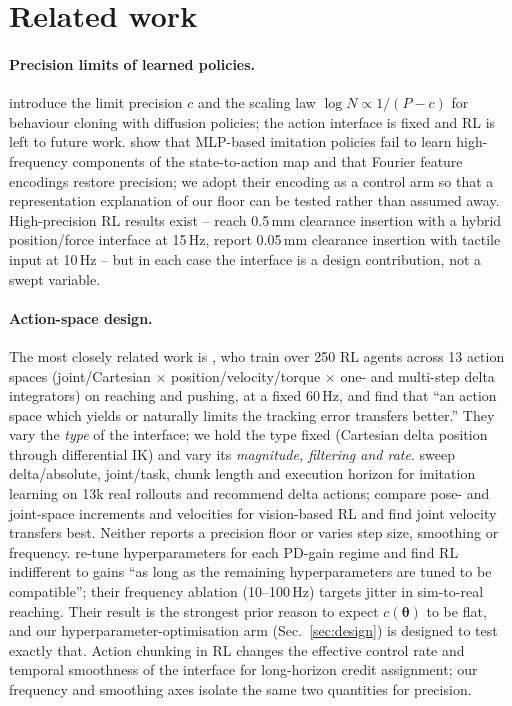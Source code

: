 \documentclass{article}
\newcommand{\iface}{\boldsymbol{\theta}}
\begin{document}
\section{Related work}
\label{sec:related}

\paragraph{Precision limits of learned policies.}
\citet{xu2026curse} introduce the limit precision $c$ and the scaling law $\log N \propto 1/(P-c)$ for behaviour cloning with diffusion policies; the action interface is fixed and RL is left to future work. \citet{gyenes2026fourier} show that MLP-based imitation policies fail to learn high-frequency components of the state-to-action map and that Fourier feature encodings \citep{tancik2020fourier} restore precision; we adopt their encoding as a control arm so that a representation explanation of our floor can be tested rather than assumed away. High-precision RL results exist -- \citet{brown2026match} reach 0.5\,mm clearance insertion with a hybrid position/force interface at 15\,Hz, \citet{meng2026reach} report 0.05\,mm clearance insertion with tactile input at 10\,Hz -- but in each case the interface is a design contribution, not a swept variable.

\paragraph{Action-space design.}
The most closely related work is \citet{aljalbout2024role}, who train over 250 RL agents across 13 action spaces (joint/Cartesian $\times$ position/velocity/torque $\times$ one- and multi-step delta integrators) on reaching and pushing, at a fixed 60\,Hz, and find that ``an action space which yields or naturally limits the tracking error transfers better.'' They vary the \emph{type} of the interface; we hold the type fixed (Cartesian delta position through differential IK) and vary its \emph{magnitude, filtering and rate}. \citet{feng2026demystifying} sweep delta/absolute, joint/task, chunk length and execution horizon for imitation learning on 13k real rollouts and recommend delta actions; \citet{azimi2026benchmarking} compare pose- and joint-space increments and velocities for vision-based RL and find joint velocity transfers best. Neither reports a precision floor or varies step size, smoothing or frequency. \citet{bronars2026tune} re-tune hyperparameters for each PD-gain regime and find RL indifferent to gains ``as long as the remaining hyperparameters are tuned to be compatible''; their frequency ablation (10--100\,Hz) targets jitter in sim-to-real reaching. Their result is the strongest prior reason to expect $c(\iface)$ to be flat, and our hyperparameter-optimisation arm (Sec.~\ref{sec:design}) is designed to test exactly that. Action chunking in RL \citep{li2025chunking,chen2026acsac} changes the effective control rate and temporal smoothness of the interface for long-horizon credit assignment; our frequency and smoothing axes isolate the same two quantities for precision.
\end{document}

